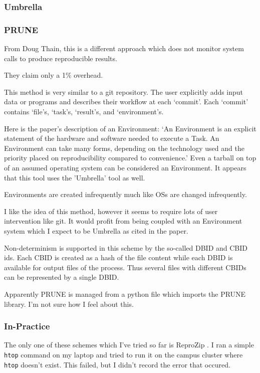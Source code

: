 \documentclass[american]{article}
\begin{document}
\subsubsection{Umbrella}


\subsubsection{PRUNE}

From Doug Thain, this is a different approach which does not monitor system calls to produce reproducible results.

They claim only a 1\% overhead.

This method is very similar to a git repository. The user explicitly adds input data or programs and describes their workflow at each `commit'. Each `commit' contains `file's, `task's, `result's, and `environment's.

Here is the paper's description of an Environment: `An Environment is an explicit statement of the hardware and software needed to execute a Task. An Environment can take many forms, depending on the technology used and the priority placed on reproducibility compared to convenience.' Even a tarball on top of an assumed operating system can be considered an Environment. It appears that this tool uses the 'Umbrella' tool as well.

Environments are created infrequently much like OSs are changed infrequently.

I like the idea of this method, however it seems to require lots of user intervention like git. It would profit from being coupled with an Environment system which I expect to be Umbrella as cited in the paper.

Non-determinism is supported in this scheme by the so-called DBID and CBID ids. Each CBID is created as a hash of the file content while each DBID is available for output files of the process. Thus several files with different CBIDs can be represented by a single DBID.

Apparently PRUNE is managed from a python file which imports the PRUNE library. I'm not sure how I feel about this.

\subsubsection{In-Practice}

The only one of these schemes which I've tried so far is ReproZip \cite{reprozip}. I ran a simple \texttt{htop} command on my laptop and tried to run it on the campus cluster where \texttt{htop} doesn't exist. This failed, but I didn't record the error that occured.
\end{document}
